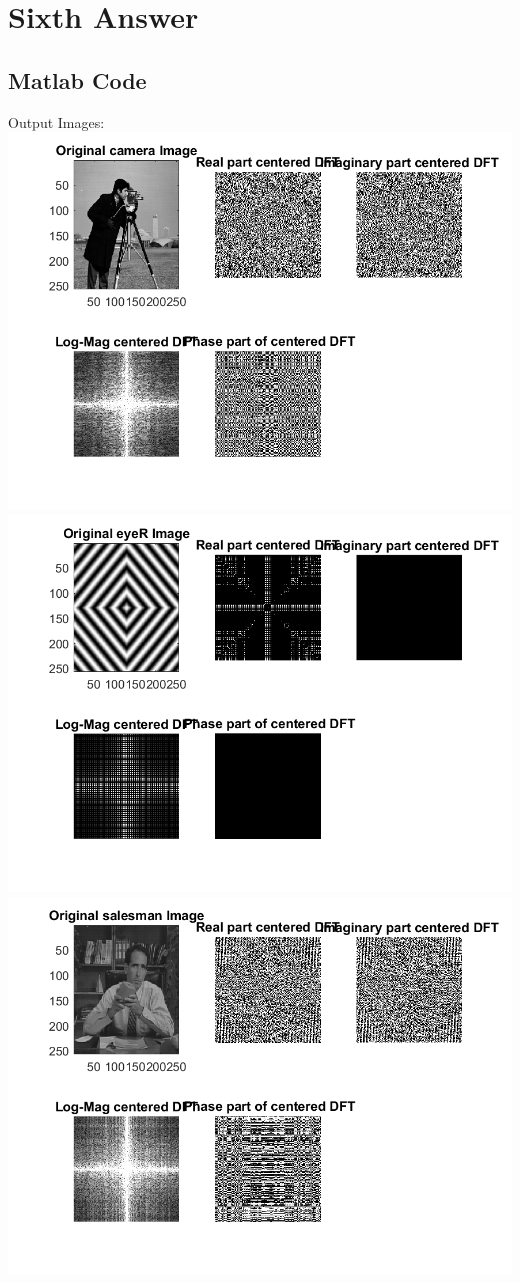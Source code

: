 \documentclass[11pt]{article} %
\begin{document}
\section {Sixth Answer}
\subsection*{Matlab Code}

Output Images:
\includegraphics{Camera.png}
\includegraphics{eyeR.png}
\includegraphics{salesman.png}
\end{document}
